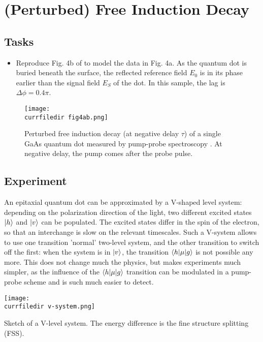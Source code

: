 \renewcommand{\lastmod}{May 1, 2020}


\chapter{(Perturbed) Free Induction Decay}



\section{Tasks}

\begin{itemize}
\item Reproduce Fig. 4b of \cite{Wolpert:2012hs} to model the data in Fig. 4a. As the quantum dot is buried beneath the surface, the reflected reference field $E_0$ is in its phase earlier than the signal field $E_S$ of the dot. In this sample, the lag is $\Delta \phi = 0.4 \pi$.
\end{itemize}

\begin{figure}
\centering
\texttt{[image: \\currfiledir fig4ab.png]}
\caption{Perturbed free induction decay (at negative delay $\tau$) of a single GaAs quantum dot measured by pump-probe spectroscopy \citep{Wolpert:2012hs}. At negative delay, the pump comes after the probe pulse.}
\end{figure}

\section{Experiment}

An epitaxial quantum dot can be approximated by a V-shaped level system: depending on the polarization direction of the light, two different excited states $\ket{h}$ and $\ket{v}$
 can be populated. The excited states differ in the spin of the electron, so that an interchange is slow on the relevant timescales. Such a V-system allows to use one transition 'normal' two-level system, and the other transition to switch off the first: when the system is in $\ket{v}$, the transition $\braket{h | \mu | g}$ is not possible any more. This does not change much the physics, but makes experiments much simpler, as the influence of the  $\braket{h | \mu | g}$ transition can be modulated in a pump-probe scheme and is such much easier to detect.
 
\begin{marginfigure}
\texttt{[image: \\currfiledir v-system.png]}
\caption{Sketch of a V-level system. The energy difference is the fine structure splitting (FSS).}
\end{marginfigure}


